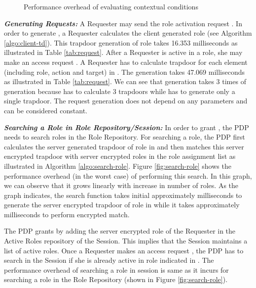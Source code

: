\documentclass[final,5p,times,twocolumn]{elsarticle}
\begin{document}
\begin{figure*}
\centering
{}
\caption{Performance overhead of evaluating contextual conditions}
\label{fig:policy-evaluation-context}
\end{figure*}


\emph{\textbf{Generating Requests:}}
A Requester may send the role activation request . In order to generate , a Requester calculates the client generated role (see Algorithm \ref{algo:client-td}). This trapdoor generation of role takes 16.353 milliseconds as illustrated in Table \ref{tab:request}. After a Requester is active in a role, she may make an access request  . A Requester has to calculate trapdoor for each element (including role, action and target) in . The  generation takes 47.069 milliseconds as illustrated in Table \ref{tab:request}. We can see that  generation takes 3 times of  generation because  has to calculate 3 trapdoors while  has to generate only a single trapdoor. The request generation does not depend on any parameters and can be considered constant.

\emph{\textbf{Searching a Role in Role Repository/Session:}}
In order to grant , the PDP needs to search roles in the Role Repository. For searching a role, the PDP first calculates the server generated trapdoor of role in  and then matches this server encrypted trapdoor with server encrypted roles in the role assignment list as illustrated in Algorithm \ref{algo:search-role}. Figure \ref{fig:search-role} shows the performance overhead (in the worst case) of performing this search. In this graph, we can observe that it grows linearly with increase in number of roles. As the graph indicates, the search function takes initial approximately  milliseconds to generate the server encrypted trapdoor of role in  while it takes approximately  milliseconds to perform encrypted match.

The PDP grants  by adding the server encrypted role of the Requester in the Active Roles repository of the Session. This implies that the Session maintains a list of active roles. Once a Requester makes an access request , the PDP has to search in the Session if she is already active in role indicated in . The performance overhead of searching a role in session is same as it incurs for searching a role in the Role Repository (shown in Figure \ref{fig:search-role}).
\end{document}
